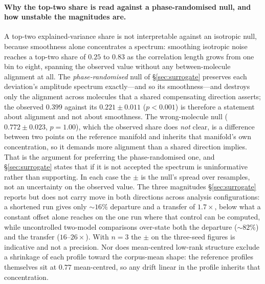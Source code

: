 \paragraph{Why the top-two share is read against a phase-randomised null, and how unstable the
magnitudes are.} A top-two explained-variance share is not interpretable against an isotropic null,
because smoothness alone concentrates a spectrum: smoothing isotropic noise reaches a top-two share
of $0.25$ to $0.83$ as the correlation length grows from one bin to eight, spanning the observed
value without any between-molecule alignment at all. The \emph{phase-randomised} null of
\S\ref{sec:surrogate} preserves each deviation's amplitude spectrum exactly---and so its
smoothness---and destroys only the alignment across molecules that a shared compensating direction
asserts; the observed $0.399$ against its $0.221\pm0.011$ ($p<0.001$) is therefore a statement
about alignment and not about smoothness. The wrong-molecule null ($0.772\pm0.023$, $p=1.00$),
which the observed share does \emph{not} clear, is a difference between two points on the
reference manifold and inherits that
manifold's own concentration, so it demands more alignment than a shared direction implies. That is
the argument for preferring the phase-randomised one, and \S\ref{sec:surrogate} states that if it is
not accepted the spectrum is uninformative rather than supporting. In each case the $\pm$ is the
null's spread over resamples, not an uncertainty on the observed value.
The three magnitudes \S\ref{sec:surrogate} reports but does not carry move in both directions across
analysis configurations: a shortened run gives only ${\sim}16\%$ departure and a transfer of
$1.7\times$, below what a constant offset alone reaches on the one run where that control can be
computed, while uncontrolled two-model comparisons over-state both the departure (${\sim}82\%$) and
the transfer ($16$--$26\times$). With $n{=}3$ the $\pm$ on the three-seed figures is indicative and
not a precision. Nor does mean-centred low-rank structure exclude a shrinkage of each profile toward
the corpus-mean shape: the reference profiles themselves sit at $0.77$ mean-centred, so any drift
linear in the profile inherits that concentration.

